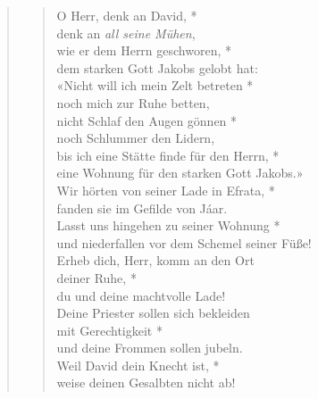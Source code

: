 



\begin{quote}
\begin{verse}

\smallskip

O Herr, denk an David, *\\ 
denk an \textit{all seine Mühen},\\ \vin
wie er dem Herrn geschworen, *\\ \vin 
dem starken Gott Jakobs gelobt hat:\\
«Nicht will ich mein Zelt betreten *\\ 
noch mich zur Ruhe betten, \\ \vin
nicht Schlaf den Augen gönnen *\\ \vin 
noch Schlummer den Lidern,\\
bis ich eine Stätte finde für den Herrn, *\\ 
eine Wohnung für den starken Gott Jakobs.»\\ \vin
Wir hörten von seiner Lade in Efrata, *\\ \vin 
fanden sie im Gefilde von Jáar.\\ 
Lasst uns hingehen zu seiner Wohnung *\\ 
und niederfallen vor dem Schemel seiner Füße! \\ \vin
Erheb dich, Herr, komm an den Ort\\ \vin  deiner Ruhe, *\\ \vin 
du und deine machtvolle Lade! \\
Deine Priester sollen sich bekleiden \\  mit Gerechtigkeit *\\ 
und deine Frommen sollen jubeln.\\ \vin  
Weil David dein Knecht ist, *\\ \vin 
weise deinen Gesalbten nicht ab!\\



\end{verse}
\end{quote}
